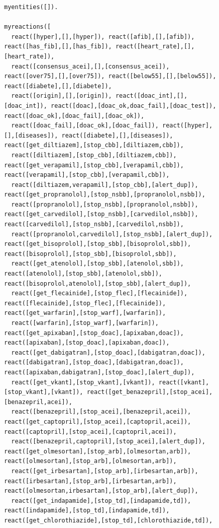 \begin{figure}[t]
\fontsize{6}{0}
\begin{verbatim}
myentities([]).

myreactions([
  react([hyper],[],[hyper]), react([afib],[],[afib]), react([has_fib],[],[has_fib]), react([heart_rate],[],[heart_rate]),
  react([consensus_acei],[],[consensus_acei]), react([over75],[],[over75]), react([below55],[],[below55]), react([diabete],[],[diabete]),
  react([origin],[],[origin]), react([doac_int],[],[doac_int]), react([doac],[doac_ok,doac_fail],[doac_test]), react([doac_ok],[doac_fail],[doac_ok]),
  react([doac_fail],[doac_ok],[doac_fail]), react([hyper],[],[diseases]), react([diabete],[],[diseases]), react([get_diltiazem],[stop_cbb],[diltiazem,cbb]),
  react([diltiazem],[stop_cbb],[diltiazem,cbb]), react([get_verapamil],[stop_cbb],[verapamil,cbb]), react([verapamil],[stop_cbb],[verapamil,cbb]),
  react([diltiazem,verapamil],[stop_cbb],[alert_dup]), react([get_propranolol],[stop_nsbb],[propranolol,nsbb]),
  react([propranolol],[stop_nsbb],[propranolol,nsbb]), react([get_carvedilol],[stop_nsbb],[carvedilol,nsbb]), react([carvedilol],[stop_nsbb],[carvedilol,nsbb]), 
  react([propranolol,carvedilol],[stop_nsbb],[alert_dup]), react([get_bisoprolol],[stop_sbb],[bisoprolol,sbb]), react([bisoprolol],[stop_sbb],[bisoprolol,sbb]),
  react([get_atenolol],[stop_sbb],[atenolol,sbb]), react([atenolol],[stop_sbb],[atenolol,sbb]), react([bisoprolol,atenolol],[stop_sbb],[alert_dup]),
  react([get_flecainide],[stop_flec],[flecainide]), react([flecainide],[stop_flec],[flecainide]), react([get_warfarin],[stop_warf],[warfarin]),
  react([warfarin],[stop_warf],[warfarin]), react([get_apixaban],[stop_doac],[apixaban,doac]), react([apixaban],[stop_doac],[apixaban,doac]),
  react([get_dabigatran],[stop_doac],[dabigatran,doac]), react([dabigatran],[stop_doac],[dabigatran,doac]), react([apixaban,dabigatran],[stop_doac],[alert_dup]),
  react([get_vkant],[stop_vkant],[vkant]), react([vkant],[stop_vkant],[vkant]), react([get_benazepril],[stop_acei],[benazepril,acei]), 
  react([benazepril],[stop_acei],[benazepril,acei]), react([get_captopril],[stop_acei],[captopril,acei]), react([captopril],[stop_acei],[captopril,acei]),
  react([benazepril,captopril],[stop_acei],[alert_dup]), react([get_olmesortan],[stop_arb],[olmesortan,arb]), react([olmesortan],[stop_arb],[olmesortan,arb]), 
  react([get_irbesartan],[stop_arb],[irbesartan,arb]), react([irbesartan],[stop_arb],[irbesartan,arb]), react([olmesortan,irbesartan],[stop_arb],[alert_dup]),
  react([get_indapamide],[stop_td],[indapamide,td]), react([indapamide],[stop_td],[indapamide,td]), react([get_chlorothiazide],[stop_td],[chlorothiazide,td]), 

\end{verbatim}
\end{figure}
